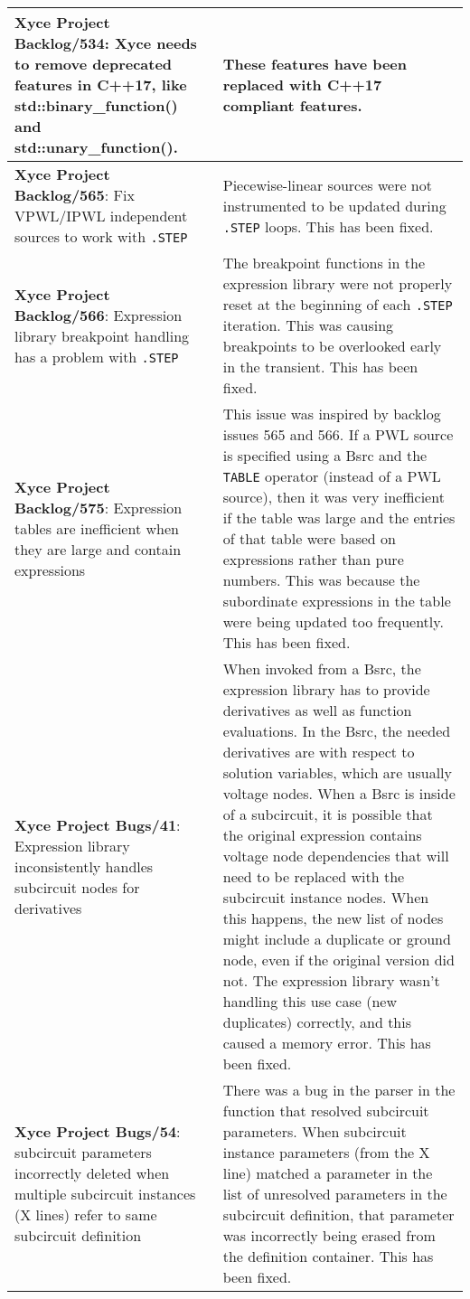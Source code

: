 {\begin{longtable}[h] {>{\raggedright\small}m{2in}|>{\raggedright\let\\\tabularnewline\small}m{3.5in}}
  \textbf{Xyce Project Backlog/534}: Xyce needs to remove deprecated
  features in C++17, like std::binary\_function() and std::unary\_function(). &
  These features have been replaced with C++17 compliant features. \\ \hline

  \textbf{Xyce Project Backlog/565}: Fix VPWL/IPWL independent sources to work 
  with \texttt{.STEP} & Piecewise-linear sources were not instrumented to be 
  updated during \texttt{.STEP} loops.  This has been fixed.  \\ \hline

  \textbf{Xyce Project Backlog/566}:  Expression library breakpoint handling has 
  a problem with \texttt{.STEP} & The breakpoint functions in the expression 
  library were not properly reset at the beginning of each \texttt{.STEP} 
  iteration.  This was causing breakpoints to be overlooked early in the transient.
  This has been fixed.  \\ \hline


  \textbf{Xyce Project Backlog/575}: 
   Expression tables are inefficient when they are large and contain expressions & 
   This issue was inspired by backlog issues 565 and 566.  If a PWL source is 
   specified using a Bsrc and the \texttt{TABLE} operator (instead of a PWL 
   source), then it was very 
   inefficient if the table was large and the entries of that table were 
   based on expressions rather than pure numbers.  This was because the subordinate 
   expressions in the table were being updated too frequently.
  This has been fixed.  \\ \hline

  \textbf{Xyce Project Bugs/41}: Expression library inconsistently handles 
  subcircuit nodes for derivatives &  When invoked from a Bsrc, the expression 
  library has to provide derivatives as well as function evaluations.  In the 
  Bsrc, the needed derivatives are with respect to solution variables, which 
  are usually voltage nodes.  When a Bsrc is inside of a subcircuit, it is 
  possible that the original expression contains voltage node dependencies 
  that will need to be replaced with the subcircuit instance nodes.  When 
  this happens, the new list of nodes might include a duplicate or ground node, 
  even if the original version did not.  The expression library wasn't 
  handling this use case (new duplicates) correctly, and this caused a 
  memory error.  This has been fixed.  \\ \hline

  \textbf{Xyce Project Bugs/54}: subcircuit parameters incorrectly 
  deleted when multiple subcircuit instances (X lines) refer to same 
  subcircuit definition &   There was a bug in the parser in the function
  that resolved subcircuit parameters.  When subcircuit instance
  parameters (from the X line) matched a parameter in the list 
  of unresolved parameters in the subcircuit definition, that parameter
  was incorrectly being erased from the definition container.
  This has been fixed.  \\ \hline


\end{longtable}}
